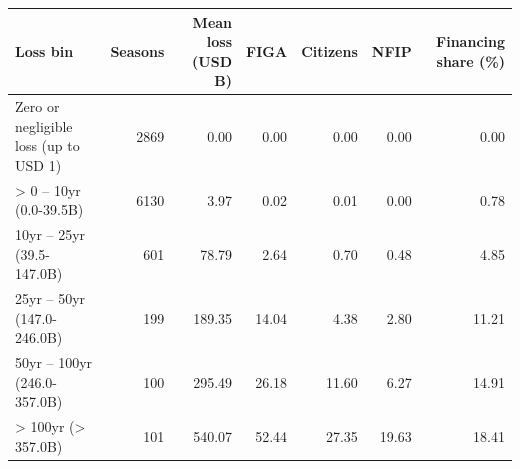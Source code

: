 \begin{tabular}{lrrrrrr}
\toprule
Loss bin & Seasons & Mean loss (USD B) & FIGA & Citizens & NFIP & Financing share (\%) \\
\midrule
Zero or negligible loss (up to USD 1) & 2869 & 0.00 & 0.00 & 0.00 & 0.00 & 0.00 \\
> 0 -- 10yr (0.0-39.5B) & 6130 & 3.97 & 0.02 & 0.01 & 0.00 & 0.78 \\
10yr -- 25yr (39.5-147.0B) & 601 & 78.79 & 2.64 & 0.70 & 0.48 & 4.85 \\
25yr -- 50yr (147.0-246.0B) & 199 & 189.35 & 14.04 & 4.38 & 2.80 & 11.21 \\
50yr -- 100yr (246.0-357.0B) & 100 & 295.49 & 26.18 & 11.60 & 6.27 & 14.91 \\
> 100yr (> 357.0B) & 101 & 540.07 & 52.44 & 27.35 & 19.63 & 18.41 \\
\bottomrule
\end{tabular}
